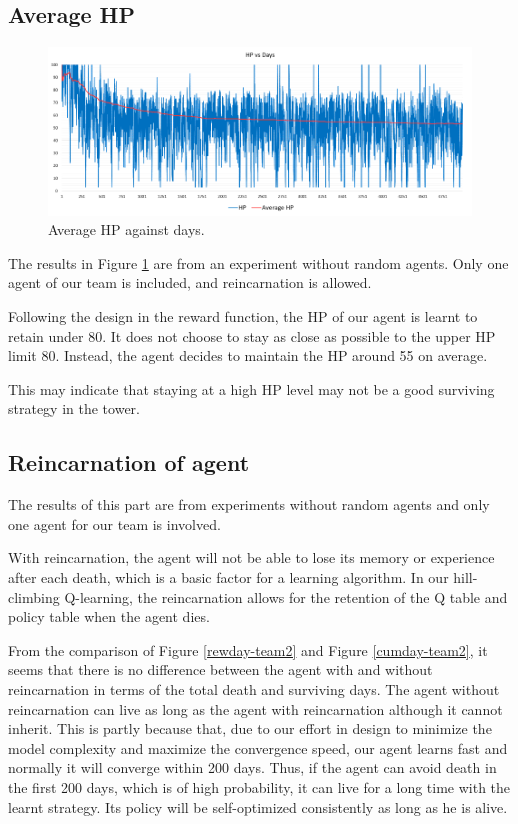 \subsection{Average HP}
\begin{figure}
\centering
\includegraphics{004_team_2_agent_design/avhpdays}
\caption{Average HP against days.}
\label{avhp-team2}
\end{figure}

The results in Figure \ref{avhp-team2} are from an experiment without random agents. Only one agent of our team is included, and reincarnation is allowed. 

Following the design in the reward function, the HP of our agent is learnt to retain under 80. It does not choose to stay as close as possible to the upper HP limit 80. Instead, the agent decides to maintain the HP around 55 on average. 

This may indicate that staying at a high HP level may not be a good surviving strategy in the tower. 

\subsection{Reincarnation of agent}
The results of this part are from experiments without random agents and only one agent for our team is involved.

With reincarnation, the agent will not be able to lose its memory or experience after each death, which is a basic factor for a learning algorithm. In our hill-climbing Q-learning, the reincarnation allows for the retention of the Q table and policy table when the agent dies. 

From the comparison of Figure \ref{rewday-team2} and Figure \ref{cumday-team2}, it seems that there is no difference between the agent with and without reincarnation in terms of the total death and surviving days. The agent without reincarnation can live as long as the agent with reincarnation although it cannot inherit. This is partly because that, due to our effort in design to minimize the model complexity and maximize the convergence speed, our agent learns fast and normally it will converge within 200 days. Thus, if the agent can avoid death in the first 200 days, which is of high probability, it can live for a long time with the learnt strategy. Its policy will be self-optimized consistently as long as he is alive. 

